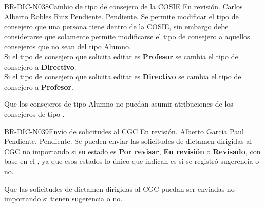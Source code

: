 \begin{BusinessRule}{BR-DIC-N038}{Cambio de tipo de consejero de la COSIE}
	{\bcDerivation} %
	{\btEnabler}     %
	{\blInfluencing}     %
	\BRItem[Estado] En revisión.
	  Carlos Alberto Robles Ruiz
	 Pendiente.
	 Pendiente.
	\BRItem[Descripción] Se permite modificar el tipo de consejero que una persona tiene dentro de la COSIE, sin embargo debe considerarse que solamente permite modificarse el tipo de consejero a aquellos consejeros que no sean del tipo Alumno. \\
	Si el tipo de consejero que solicita editar es \textbf{Profesor} se cambia el tipo de consejero a \textbf{Directivo}. \\
	Si el tipo de consejero que solicita editar es \textbf{Directivo} se cambia el tipo de consejero a \textbf{Profesor}.
	
	\BRItem[Motivación] Que los consejeros de tipo Alumno no puedan asumir atribuciones de los consejeros de tipo .
	
\end{BusinessRule}


\begin{BusinessRule}{BR-DIC-N039}{Envío de solicitudes al CGC}
	{\bcCondition} %
	{\btEnabler}     %
	{\blControlling}     %
	\BRItem[Estado] En revisión.
	  Alberto García Paul
	 Pendiente.
	 Pendiente.
	\BRItem[Descripción] Se pueden enviar las solicitudes de dictamen dirigidas al CGC no importando si su estado es \textbf{Por revisar}, \textbf{En revisión} o \textbf{Revisado}, con base en el , ya que esos estados lo único que indican es si se registró sugerencia o no.
	
	\BRItem[Motivación] Que las solicitudes de dictamen dirigidas al CGC puedan ser enviadas no importando si tienen sugerencia o no.
\end{BusinessRule}

